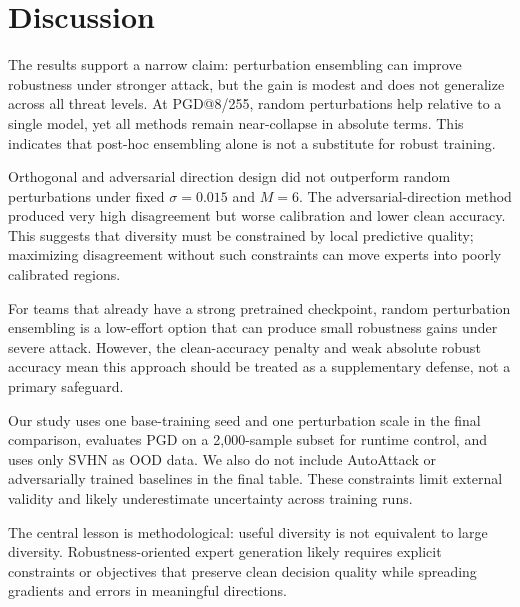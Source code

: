 \section{Discussion}
\label{sec:discussion}

 The results support a narrow claim: perturbation ensembling can improve robustness under stronger attack, but the gain is modest and does not generalize across all threat levels. At PGD@8/255, random perturbations help relative to a single model, yet all methods remain near-collapse in absolute terms. This indicates that post-hoc ensembling alone is not a substitute for robust training.

 Orthogonal and adversarial direction design did not outperform random perturbations under fixed $\sigma=0.015$ and $M=6$. The adversarial-direction method produced very high disagreement but worse calibration and lower clean accuracy. This suggests that diversity must be constrained by local predictive quality; maximizing disagreement without such constraints can move experts into poorly calibrated regions.

 For teams that already have a strong pretrained checkpoint, random perturbation ensembling is a low-effort option that can produce small robustness gains under severe attack. However, the clean-accuracy penalty and weak absolute robust accuracy mean this approach should be treated as a supplementary defense, not a primary safeguard.

 Our study uses one base-training seed and one perturbation scale in the final comparison, evaluates PGD on a 2{,}000-sample subset for runtime control, and uses only SVHN as OOD data. We also do not include AutoAttack or adversarially trained baselines in the final table. These constraints limit external validity and likely underestimate uncertainty across training runs.

 The central lesson is methodological: useful diversity is not equivalent to large diversity. Robustness-oriented expert generation likely requires explicit constraints or objectives that preserve clean decision quality while spreading gradients and errors in meaningful directions.
